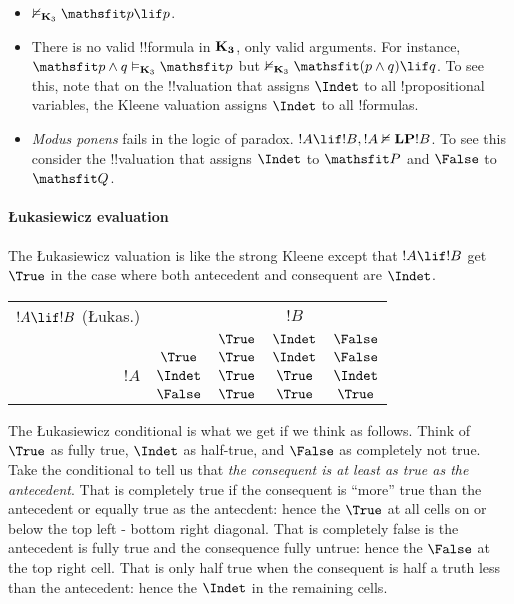 \documentclass[../../../include/open-logic-section]{subfiles}
\begin{document}
\begin{itemize}
  \item $\Entails/[\Log K_3] \Obj p \lif p$. 
  \item There is no valid !!{formula} in $\mathbf{K_3}$, only valid arguments. For instance, $\Obj{p \land q} \Entails[\Log K_3] \Obj{p}$ but $\Entails/[\Log K_3] \Obj{(p \land q) \lif q}$. To see this, note that on the !!{valuation} that assigns $\Indet$ to all !{propositional variable}s, the Kleene valuation assigns $\Indet$ to all !{formula}s.
  \item \emph{Modus ponens} fails in the logic of paradox. $!A \lif !B, !A \Entails/{\Log{LP}} !B$. To see this consider the !!{valuation} that assigns $\Indet$ to $\Obj{P}$ and $\False$ to $\Obj{Q}$.
\end{itemize}

\paragraph{Łukasiewicz evaluation} The Łukasiewicz valuation is like the strong Kleene except that $!A \lif !B$ get $\True$ in the case where both antecedent and consequent are $\Indet$. 

\begin{center}
  \begin{tabular}{|rc|ccc|} \hline 
     $!A \lif !B$ (Łukas.) & & & $!B$ &  \\
     & & $\True$ & $\Indet$ & $\False$ \\
    \hline \hline 
    & $\True$ & $\True$ & $\Indet$ & $\False$ \\ 
    $!A$ & $\Indet$ & $\True$ & $\True$ & $\Indet$ \\ 
    & $\False$ & $\True$ & $\True$ & $\True$ \\
    \hline 
  \end{tabular}
\end{center} 

\begin{explain}

The Łukasiewicz conditional is what we get if we think as follows. Think of $\True$ as fully true, $\Indet$ as half-true, and $\False$ as completely not true. Take the conditional to tell us that \emph{the consequent is at least as true as the antecedent}. That is completely true if the consequent is ``more'' true than the antecedent or equally true as the antecdent: hence the $\True$ at all cells on or below the top left - bottom right diagonal. That is completely false is the antecedent is fully true and the consequence fully untrue: hence the $\False$ at the top right cell. That is only half true when the consequent is half a truth less than the antecedent: hence the $\Indet$ in the remaining cells. 

\end{explain}
\end{document}
